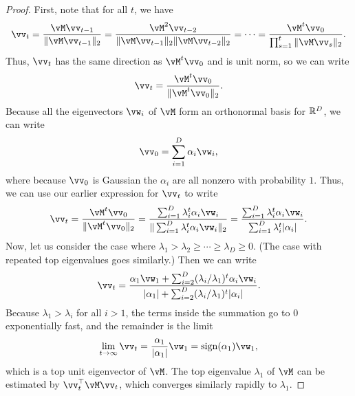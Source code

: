 \documentclass[\toplevelprefix/book-main.tex]{subfiles}
\begin{document}
\begin{proof} First, note that for all \(t\), we have 
\begin{equation}
    \vv_{t} = \frac{\vM\vv_{t - 1}}{\norm{\vM\vv_{t - 1}}_{2}} = \frac{\vM^{2}\vv_{t - 2}}{\norm{\vM\vv_{t - 1}}_{2}\norm{\vM\vv_{t - 2}}_{2}} = \cdots = \frac{\vM^{t}\vv_{0}}{\prod_{s = 1}^{t}\norm{\vM\vv_{s}}_{2}}.
\end{equation}
Thus, \(\vv_{t}\) has the same direction as \(\vM^{t}\vv_{0}\) and is unit norm, so we can write 
\begin{equation}
    \vv_{t} = \frac{\vM^{t}\vv_{0}}{\norm{\vM^{t}\vv_{0}}_{2}}.
\end{equation}
Because all the eigenvectors \(\vw_{i}\) of $\vM$ form an orthonormal basis for \(\mathbb{R}^{D}\), we can write 
\begin{equation}
    \vv_{0} = \sum_{i = 1}^{D}\alpha_{i}\vw_{i},
\end{equation}
where because \(\vv_{0}\) is Gaussian the \(\alpha_{i}\) are all nonzero with probability \(1\). Thus, we can use our earlier expression for \(\vv_{t}\) to write
\begin{equation}
    \vv_{t} = \frac{\vM^{t}\vv_{0}}{\norm{\vM^{t}\vv_{0}}_{2}} = \frac{\sum_{i = 1}^{D}\lambda_{i}^{t}\alpha_{i}\vw_{i}}{\norm{\sum_{i = 1}^{D}\lambda_{i}^{t}\alpha_{i}\vw_{i}}_{2}} = \frac{\sum_{i = 1}^{D}\lambda_{i}^{t}\alpha_{i}\vw_{i}}{\sum_{i = 1}^{D}\lambda_{i}^{t}\abs{\alpha_{i}}}. 
\end{equation}
Now, let us consider the case where \(\lambda_{1} > \lambda_{2} \geq \cdots \geq \lambda_{D} \geq 0\). (The case with repeated top eigenvalues goes similarly.) Then we can write
\begin{equation}
    \vv_{t} = \frac{\alpha_{1}\vw_{1} + \sum_{i = 2}^{D}(\lambda_{i}/\lambda_{1})^{t}\alpha_{i}\vw_{i}}{\abs{\alpha_{1}} + \sum_{i = 2}^{D}(\lambda_{i}/\lambda_{1})^{t}\abs{\alpha_{i}}}.
\end{equation}
Because \(\lambda_{1} > \lambda_{i}\) for all \(i > 1\), the terms inside the summation go to \(0\) exponentially fast, and the remainder is the limit 
\begin{equation}
    \lim_{t \to \infty}\vv_{t} = \frac{\alpha_{1}}{\abs{\alpha_{1}}}\vw_{1} = \sign(\alpha_{1})\vw_{1},
\end{equation}
which is a top unit eigenvector of \(\vM\). The top eigenvalue \(\lambda_{1}\) of \(\vM\) can be estimated by \(\vv_{t}^{\top}\vM\vv_{t}\), which converges similarly rapidly to \(\lambda_{1}\). 
\end{proof}
\end{document}
